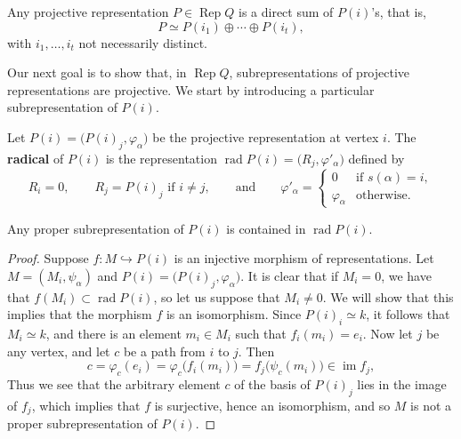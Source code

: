 \documentclass[11pt, a4paper]{report}
\begin{document}
        \begin{corollary}\label{cor:8.2.13}
            Any projective representation $P\in \operatorname{Rep}Q$ is a direct sum of $P(i)$'s, that is,
        \[
        P\simeq P(i_1)\oplus \cdots \oplus P(i_t),
        \]
        with $i_1,\ldots,i_t$ not necessarily distinct.
        \end{corollary}

        Our next goal is to show that, in $\operatorname{Rep}Q$, subrepresentations of projective representations are projective. We start by introducing a particular subrepresentation of $P(i)$.

        \begin{definition}
            Let $P(i)=\bigl(P(i)_j,\varphi_\alpha\bigr)$ be the projective representation at vertex $i$. The \textbf{radical} of $P(i)$ is the representation $\operatorname{rad}P(i)=\bigl(R_j,\varphi'_\alpha\bigr)$ defined by
        \[
        R_i=0,\qquad R_j=P(i)_j \text{ if } i\neq j,\qquad \text{and}\qquad
        \varphi'_\alpha=
        \begin{cases}
        0 & \text{if } s(\alpha)=i,\\
        \varphi_\alpha & \text{otherwise.}
        \end{cases}
        \]
        \end{definition}

        \begin{lemma}
            Any proper subrepresentation of $P(i)$ is contained in $\operatorname{rad}P(i)$.
        \end{lemma}

        \begin{proof}
        Suppose $f:M\hookrightarrow P(i)$ is an injective morphism of representations. Let $M=(M_i,\psi_\alpha)$ and $P(i)=\bigl(P(i)_j,\varphi_\alpha\bigr)$. It is clear that if $M_i=0$, we have that $f(M_i)\subset \operatorname{rad}P(i)$, so let us suppose that $M_i\neq 0$. We will show that this implies that the morphism $f$ is an isomorphism. Since $P(i)_i\simeq k$, it follows that $M_i\simeq k$, and there is an element $m_i\in M_i$ such that $f_i(m_i)=e_i$. Now let $j$ be any vertex, and let $c$ be a path from $i$ to $j$. Then
        \[
        c=\varphi_c(e_i)=\varphi_c\bigl(f_i(m_i)\bigr)=f_j\bigl(\psi_c(m_i)\bigr)\in \operatorname{im} f_j,
        \]
     Thus we see that the arbitrary element $c$ of the basis of $P(i)_j$ lies in the image of $f_j$, which implies that $f$ is surjective, hence an isomorphism, and so $M$ is not a proper subrepresentation of $P(i)$.
        \end{proof}
\end{document}
